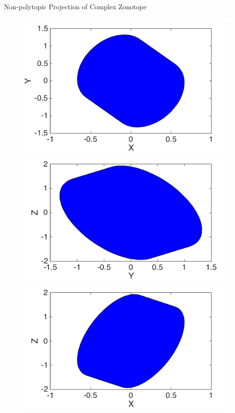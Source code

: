 \begin{frame}{Non-polytopic Projection of Complex Zonotope}
%
\begin{figure}
\center
\includegraphics[scale=0.3]{figures/CZtopes/xycz.png}
\includegraphics[scale=0.3]{figures/CZtopes/yzcz.png}\\
\includegraphics[scale=0.3]{figures/CZtopes/xzcz.png}
\end{figure}
%
\end{frame}

